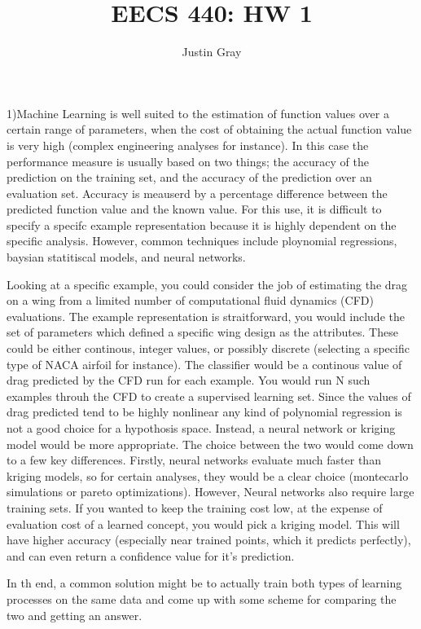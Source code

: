 \documentclass[12pt]{article}
\title{EECS 440: HW 1}
\author{Justin Gray}
\begin{document}
\maketitle

1)Machine Learning is well suited to the estimation of function values over a 
certain range of parameters, when the cost of obtaining the actual function value
is very high (complex engineering analyses for instance). In this case the performance
measure is usually based on two things; the accuracy of the prediction on the training 
set, and the accuracy of the prediction over an evaluation set. Accuracy is meauserd 
by a percentage difference between the predicted function value and the known value. 
For this use, it is difficult to specify a specifc example representation because it 
is highly dependent on the specific analysis. However, common techniques include 
ploynomial regressions, baysian statitiscal models, and neural networks. 

Looking at a specific example, you could consider the job of estimating the drag on a wing
from a limited number of computational fluid dynamics (CFD) evaluations. The example 
representation is straitforward, you would include the set of parameters which defined
a specific wing design as the attributes. These could be either continous, integer values, 
or possibly discrete (selecting a specific type of NACA airfoil for instance). The 
classifier would be a continous value of drag predicted by the CFD run for each example. 
You would run N such examples throuh the CFD to create a supervised learning set. 
Since the values of drag predicted tend to be highly nonlinear any kind of polynomial 
regression is not a good choice for a hypothosis space. Instead, a neural network or 
kriging model would be more appropriate. The choice between the two would come down to a
few key differences. Firstly, neural networks evaluate much faster than kriging models, 
so for certain analyses, they would be a clear choice (montecarlo simulations or 
pareto optimizations). However, Neural networks also require large training sets. If you
wanted to keep the training cost low, at the expense of evaluation cost of a learned concept, 
you would pick a kriging model. This will have higher accuracy (especially near trained points, 
which it predicts perfectly), and can even return a confidence value for it's prediction. 

In th end, a common solution might be to actually train both types of learning processes
on the same data and come up with some scheme for comparing the two and getting an answer. 
\end{document}
